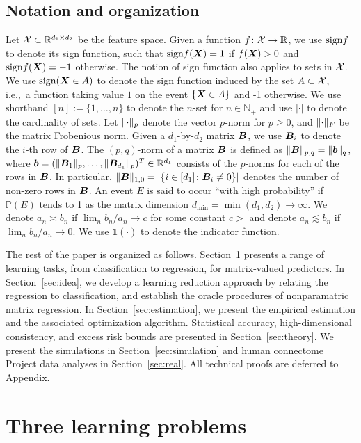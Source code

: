 \documentclass[11pt]{article}
\theoremstyle{plain}
\theoremstyle{definition}
\def\sign{\textup{sign}}
\begin{document}
 
 
\subsection{Notation and organization} 
Let $\mathcal{X}\subset \mathbb{R}^{d_1\times d_2}$ be the feature space. Given a function $f\colon \mathcal{X} \to \mathbb{R}$, we use $\sign f$ to denote its sign function, such that $\sign f(\mX)=1$ if $f(\bm X)>0$ and $\sign f(\mX)=-1$ otherwise. The notion of sign function also applies to sets in $\mathcal{X}$. We use $\sign (\mX\in A)$ to denote the sign function induced by the set $A\subset\mathcal{X}$, i.e.,\ a function taking value $1$ on the event $\{\bm X\in A\}$ and -1 otherwise. We use shorthand $[n]:=\{1,\ldots,n\}$ to denote the $n$-set for $n\in\mathbb{N}_{+}$ and use $|\cdot|$ to denote the cardinality of sets. Let $\lVert\cdot\rVert_p$ denote the vector $p$-norm for $p\geq 0$, and $\lVert\cdot\rVert_F$ be the matrix Frobenious norm. Given a $d_1$-by-$d_2$ matrix $\bm B$, we use $\bm B_i$ to denote the $i$-th row of $\bm B$. The $(p,q)$-norm of a matrix $\bm B$ is defined as $\lVert\bm B\rVert_{p,q}=\lVert\bm{b}\rVert_q$, where $\bm{b}=(\lVert\bm B_1\rVert_p,\ldots,\lVert\bm B_{d_1}\rVert_p)^T\in\mathbb{R}^{d_1}$ consists of the $p$-norms for each of the rows in $\bm B$. In particular, $\lVert\bm B\rVert_{1,0}=|\{i\in [d_1]\colon \bm B_i\neq 0\}|$ denotes the number of non-zero rows in $\bm B$. An event $E$ is said to occur ``with high probability'' if $\mathbb{P}(E)$ tends to 1 as the matrix dimension $d_{\min}=\min(d_1,d_2)\to\infty$. We denote $a_n\asymp b_n$ if $\lim_n b_n/a_n\rightarrow c$ for some constant $c>$ and denote $a_n\lesssim b_n$ if $\lim_n b_n/a_n\rightarrow 0.$ We use $\mathds{1}(\cdot)$ to denote the indicator function. 

The rest of the paper is organized as follows. Section~\ref{sec:problem} presents a range of learning tasks, from classification to regression, for matrix-valued predictors. In Section~\ref{sec:idea}, we develop a learning reduction approach by relating the regression to classification, and establish the oracle procedures of nonparamatric matrix regression. In Section~\ref{sec:estimation}, we present the empirical estimation and the associated optimization algorithm. Statistical accuracy, high-dimensional consistency, and excess risk bounds are presented in Section~\ref{sec:theory}. We present the simulations in Section~\ref{sec:simulation} and human connectome Project data analyses in Section~\ref{sec:real}. All technical proofs are deferred to Appendix. 

\section{Three learning problems}\label{sec:problem}
\end{document}
